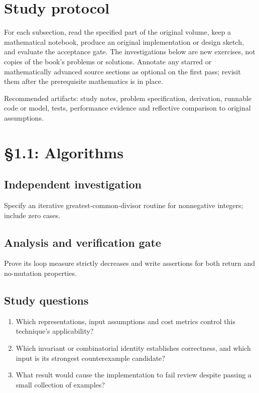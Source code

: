 \documentclass[11pt,letterpaper]{article}
\begin{document}
\tableofcontents
\clearpage
{}
\section{Study protocol}

For each subsection, read the specified part of the original volume, keep a mathematical notebook, produce an original implementation or design sketch, and evaluate the acceptance gate. The investigations below are new exercises, not copies of the book's problems or solutions. Annotate any starred or mathematically advanced source sections as optional on the first pass; revisit them after the prerequisite mathematics is in place.
\begin{evidencebox}Recommended artifacts: study notes, problem specification, derivation, runnable code or model, tests, performance evidence and reflective comparison to original assumptions.\end{evidencebox}

\section{\S 1.1: Algorithms}
\subsection{Independent investigation}
Specify an iterative greatest-common-divisor routine for nonnegative integers; include zero cases.
\subsection{Analysis and verification gate}
Prove its loop measure strictly decreases and write assertions for both return and no-mutation properties.
\subsection{Study questions}
\begin{enumerate}
\item Which representations, input assumptions and cost metrics control this technique's applicability?
\item Which invariant or combinatorial identity establishes correctness, and which input is its strongest counterexample candidate?
\item What result would cause the implementation to fail review despite passing a small collection of examples?
\end{enumerate}
\end{document}
